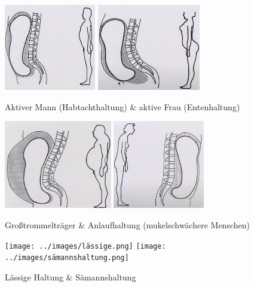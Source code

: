 \documentclass[xcolor=dvipsnames]{beamer}
\begin{document}
\begin{frame}[allowframebreaks]
        \begin{figure}
            \includegraphics[width=4cm]{../images/habtachthaltung.png}
            \includegraphics[width=4.5cm]{../images/entenhaltung.png}
            \caption{Aktiver Mann (Habtachthaltung) \& aktive Frau (Entenhaltung)}
        \end{figure}

        \begin{figure}
            \includegraphics[width=4.7cm]{../images/großtrommelträger.png}
            \includegraphics[width=4cm]{../images/anlaufhaltung.png}
            \caption{Großtrommelträger \& Anlaufhaltung (mukelschwächere Menschen)}
        \end{figure}

        \begin{figure}
            \texttt{[image: ../images/lässige.png]}
            \texttt{[image: ../images/sämannshaltung.png]}
            \caption{Lässige Haltung \& Sämannshaltung}
        \end{figure}
    \end{frame}
\end{document}
